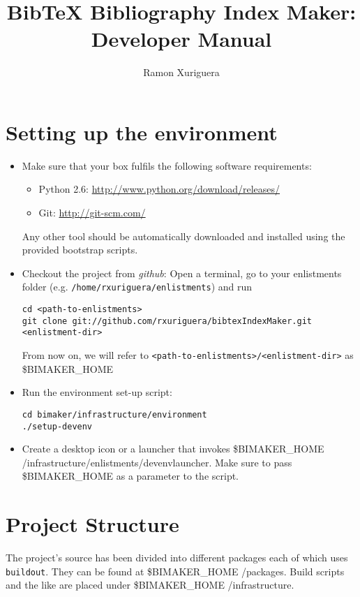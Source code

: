 \documentclass[a4paper,oneside]{article}
\title{BibTeX Bibliography Index Maker: Developer Manual}
\author{Ramon Xuriguera}
\date{}
\newcommand{\bimhome}{\$BIMAKER\_HOME }
\begin{document}
\maketitle

\section{Setting up the environment}
\begin{itemize}
    \item{}
    Make sure that your box fulfils the following software requirements:
    \begin{itemize}
        \item{Python 2.6: }
            \url{http://www.python.org/download/releases/}
        \item{Git: }
            \url{http://git-scm.com/}
    \end{itemize}
    Any other tool should be automatically downloaded and installed using the provided bootstrap scripts.

    \item{Checkout the project from \textit{github}:}
    Open a terminal, go to your enlistments folder (e.g. \texttt{/home/rxuriguera/enlistments}) and run
    \begin{lstlisting}
cd <path-to-enlistments>
git clone git://github.com/rxuriguera/bibtexIndexMaker.git <enlistment-dir>
    \end{lstlisting}
    From now on, we will refer to \texttt{<path-to-enlistments>/<enlistment-dir>} as \bimhome

    \item{}
    Run the environment set-up script:
    \begin{lstlisting}
cd bimaker/infrastructure/environment
./setup-devenv
    \end{lstlisting}

    \item{}
    Create a desktop icon or a launcher that invokes \bimhome/infrastructure/enlistments/devenvlauncher. Make sure to pass \bimhome as a parameter to the script.
\end{itemize}

\section{Project Structure}
The project's source has been divided into different packages each of which uses \texttt{buildout}. They can be found at \bimhome/packages. Build scripts and the like are placed under \bimhome/infrastructure.
\end{document}

